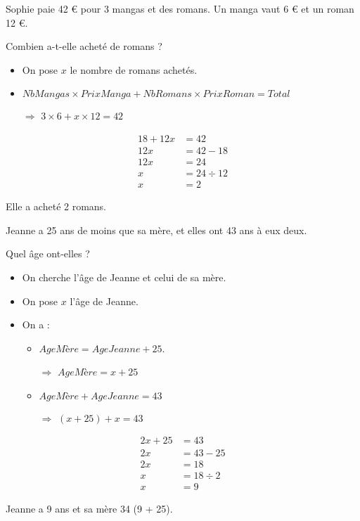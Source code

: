 \documentclass[12pt,a4paper]{article}
\begin{document}
\begin{myact}{2}
	Sophie paie 42 € pour 3 mangas et des romans. Un manga vaut 6 € et un roman 12 €. 
	
	Combien a-t-elle acheté de romans ?
\end{myact}

\begin{myrep}
		\begin{itemize}
			\item On pose $x$ le nombre de romans achetés.
			\item $NbMangas \times PrixManga + NbRomans \times PrixRoman = Total $
			\item[$\Rightarrow$]$3 \times 6 + x \times 12 = 42$
		\end{itemize}
		
		\begin{align*}
			18 + 12x &= 42\\
			12x &= 42 - 18 \\
			12x &= 24 \\
			x &= 24 \div 12\\
			x &= 2
		\end{align*}
	
	Elle a acheté 2 romans.
\end{myrep}

\begin{myact}{3}
	Jeanne a 25 ans de moins que sa mère, et elles ont 43 ans à eux deux. 
	
	Quel âge ont-elles ?
\end{myact}

\begin{myrep}
	\begin{itemize}
		\item On cherche l'âge de Jeanne et celui de sa mère.
		\item On pose $x$ l'âge de Jeanne.
		\item On a :
		\begin{itemize}
			
		\item $AgeMère = AgeJeanne + 25$.
		\item[$\Rightarrow$] $AgeMère = x + 25 $
		\item $AgeMère + AgeJeanne = 43$
		\item[$\Rightarrow$] $(x + 25) + x = 43$ 
		\end{itemize} 
	\end{itemize}
	
	\begin{align*}
		2x + 25 &= 43\\
		2x &= 43 - 25\\
		2x &= 18 \\
		x &= 18 \div 2 \\
		x &= 9
	\end{align*}
	
	Jeanne a 9 ans et sa mère 34 (9 + 25).
\end{myrep}
\end{document}
